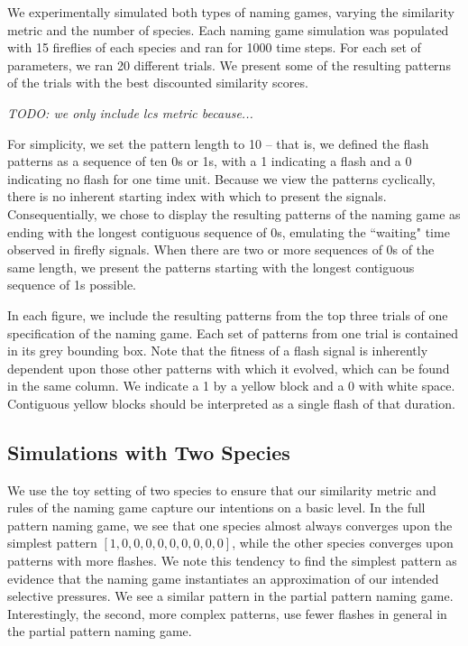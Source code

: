 We experimentally simulated both types of naming games, varying the similarity metric and the number of species.
Each naming game simulation was populated with 15 fireflies of each species and ran for 1000 time steps. 
For each set of parameters, we ran 20 different trials. We present some of the resulting patterns of the trials with the best discounted similarity scores. 

\emph{TODO: we only include lcs metric because...}

For simplicity, we set the pattern length to 10 -- that is, we defined the flash patterns as a sequence of ten 0s or 1s, with a 1 indicating a flash and a 0 indicating no flash for one time unit. 
Because we view the patterns cyclically, there is no inherent starting index with which to present the signals. 
Consequentially, we chose to display the resulting patterns of the naming game as ending with the longest contiguous sequence of 0s, emulating the ``waiting" time observed in firefly signals. When there are two or more sequences of 0s of the same length, we present the patterns starting with the longest contiguous sequence of 1s possible. 

In each figure, we include the resulting patterns from the top three trials of one specification of the naming game. 
Each set of patterns from one trial is contained in its grey bounding box.
Note that the fitness of a flash signal is inherently dependent upon those other patterns with which it evolved, which can be found in the same column. 
We indicate a 1 by a yellow block and a 0 with white space. Contiguous yellow blocks should be interpreted as a single flash of that duration. 

\subsection{Simulations with Two Species}
We use the toy setting of two species to ensure that our similarity metric and rules of the naming game capture our intentions on a basic level.
In the full pattern naming game, we see that one species almost always converges upon the simplest pattern $[1,0,0,0,0,0,0,0,0,0]$, while the other species converges upon patterns with more flashes. We note this tendency to find the simplest pattern as evidence that the naming game instantiates an approximation of our intended selective pressures. 
We see a similar pattern in the partial pattern naming game. Interestingly, the second, more complex patterns, use fewer flashes in general in the partial pattern naming game. 

